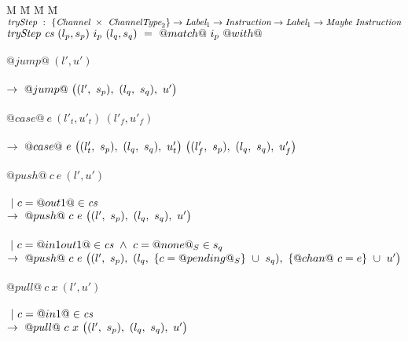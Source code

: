 

\begin{figure}
\begin{tabbing}
M \= M \= M \= M \kill
$\textit{tryStep} ~:~ \{\textit{Channel} ~\times~ \textit{ChannelType}_2\} \to \textit{Label}_1 \to \textit{Instruction} \to \textit{Label}_1 \to \textit{Maybe}~\textit{Instruction}$ \\
$\textit{tryStep} ~\textit{cs}~(l_p,s_p)~i_p~(l_q,s_q)~=~@match@~i_p~@with@$ \\

\\
\> $@jump@~(l',u')$ \\
\> \>  \\
\> \> $\to~@jump@~
      \big((l',~s_p),~(l_q,~s_q),~u' \big)
      $ \\

\\


\> $@case@~e~(l'_t,u'_t)~(l'_f,u'_f)$ \\
\> \>  \\
\> \> $\to~@case@~e~
      \big((l'_t,~s_p),~(l_q,~s_q),~u'_t \big)
      ~
      \big((l'_f,~s_p),~(l_q,~s_q),~u'_f \big)
      $ \\

\\

\> $@push@~c~e~(l',u')$ \\
\> \> \\
\> \> $~|~c=@out1@\in\textit{cs}$ \\
\> \> $\to~@push@~c~e~
      \big((l',~s_p),~(l_q,~s_q),~u' \big)
      $ \\

\> \> \\
\> \> $~|~c=@in1out1@\in\textit{cs} ~\wedge~ c=@none@_S \in s_q$ \\
\> \> $\to~@push@~c~e~
      \big((l',~s_p),~(l_q,~\{ c=@pending@_S \}~\cup~s_q),~\{ @chan@~c=e \}~\cup~u' \big)
      $ \\

\\

\> $@pull@~c~x~(l',u')$ \\
\> \> \\
\> \> $~|~c=@in1@\in\textit{cs}$ \\
\> \> $\to~@pull@~c~x~
      \big((l',~s_p),~(l_q,~s_q),~u' \big)
    $ \\


\end{tabbing}
\end{figure}
